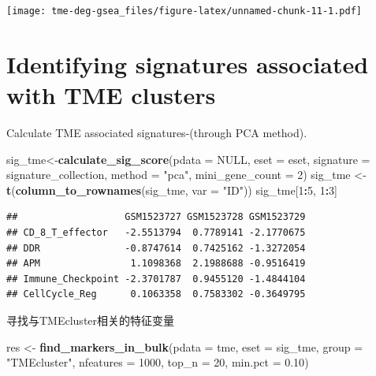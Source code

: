 \documentclass[
  12pt,
]{book}
\newenvironment{Shaded}{\begin{snugshade}}{\end{snugshade}}
\newcommand{\AttributeTok}[1]{\textcolor[rgb]{0.13,0.29,0.53}{#1}}
\newcommand{\ConstantTok}[1]{\textcolor[rgb]{0.56,0.35,0.01}{#1}}
\newcommand{\DecValTok}[1]{\textcolor[rgb]{0.00,0.00,0.81}{#1}}
\newcommand{\FloatTok}[1]{\textcolor[rgb]{0.00,0.00,0.81}{#1}}
\newcommand{\FunctionTok}[1]{\textcolor[rgb]{0.13,0.29,0.53}{\textbf{#1}}}
\newcommand{\NormalTok}[1]{#1}
\newcommand{\OtherTok}[1]{\textcolor[rgb]{0.56,0.35,0.01}{#1}}
\newcommand{\SpecialCharTok}[1]{\textcolor[rgb]{0.81,0.36,0.00}{\textbf{#1}}}
\newcommand{\StringTok}[1]{\textcolor[rgb]{0.31,0.60,0.02}{#1}}
\begin{document}
\texttt{[image: tme-deg-gsea\_files/figure-latex/unnamed-chunk-11-1.pdf]}

\hypertarget{identifying-signatures-associated-with-tme-clusters}{%
\section{Identifying signatures associated with TME clusters}\label{identifying-signatures-associated-with-tme-clusters}}

Calculate TME associated signatures-(through PCA method).

\begin{Shaded}
\begin{Highlighting}[]
\NormalTok{sig\_tme}\OtherTok{\textless{}{-}}\FunctionTok{calculate\_sig\_score}\NormalTok{(}\AttributeTok{pdata           =} \ConstantTok{NULL}\NormalTok{,}
                             \AttributeTok{eset            =}\NormalTok{ eset,}
                             \AttributeTok{signature       =}\NormalTok{ signature\_collection,}
                             \AttributeTok{method          =} \StringTok{"pca"}\NormalTok{,}
                             \AttributeTok{mini\_gene\_count =} \DecValTok{2}\NormalTok{)}
\NormalTok{sig\_tme }\OtherTok{\textless{}{-}} \FunctionTok{t}\NormalTok{(}\FunctionTok{column\_to\_rownames}\NormalTok{(sig\_tme, }\AttributeTok{var =} \StringTok{"ID"}\NormalTok{))}
\NormalTok{sig\_tme[}\DecValTok{1}\SpecialCharTok{:}\DecValTok{5}\NormalTok{, }\DecValTok{1}\SpecialCharTok{:}\DecValTok{3}\NormalTok{]}
\end{Highlighting}
\end{Shaded}

\begin{verbatim}
##                   GSM1523727 GSM1523728 GSM1523729
## CD_8_T_effector   -2.5513794  0.7789141 -2.1770675
## DDR               -0.8747614  0.7425162 -1.3272054
## APM                1.1098368  2.1988688 -0.9516419
## Immune_Checkpoint -2.3701787  0.9455120 -1.4844104
## CellCycle_Reg      0.1063358  0.7583302 -0.3649795
\end{verbatim}

寻找与TMEcluster相关的特征变量

\begin{Shaded}
\begin{Highlighting}[]
\NormalTok{res }\OtherTok{\textless{}{-}} \FunctionTok{find\_markers\_in\_bulk}\NormalTok{(}\AttributeTok{pdata =}\NormalTok{ tme, }\AttributeTok{eset =}\NormalTok{ sig\_tme, }\AttributeTok{group =} \StringTok{"TMEcluster"}\NormalTok{, }\AttributeTok{nfeatures =} \DecValTok{1000}\NormalTok{, }\AttributeTok{top\_n =} \DecValTok{20}\NormalTok{, }\AttributeTok{min.pct =} \FloatTok{0.10}\NormalTok{)}
\end{Highlighting}
\end{Shaded}
\end{document}
